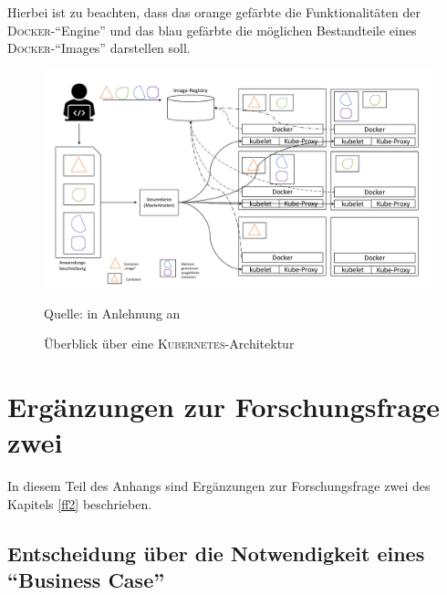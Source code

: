 Hierbei ist zu beachten, dass das orange gefärbte die Funktionalitäten der \textsc{Docker}-\enquote{Engine} und das blau gefärbte die möglichen Bestandteile eines \textsc{Docker}-\enquote{Images} darstellen soll.


\begin{figure}[H]
	\centering
	\includegraphics[scale=0.46]{img/k8sArch.pdf}
	\caption{Überblick über eine \textsc{Kubernetes}-Architektur}
	{\footnotesize Quelle: in Anlehnung an \cite[][S.23]{luksa_kubernetes_2018}}
	\label{abb:k8sArch}
\end{figure}

\chapter{Ergänzungen zur Forschungsfrage zwei} \label{appendixFF2}
In diesem Teil des Anhangs sind Ergänzungen zur Forschungsfrage zwei des Kapitels \vref{ff2} beschrieben.

\section{Entscheidung über die Notwendigkeit eines \enquote{Business Case}}

